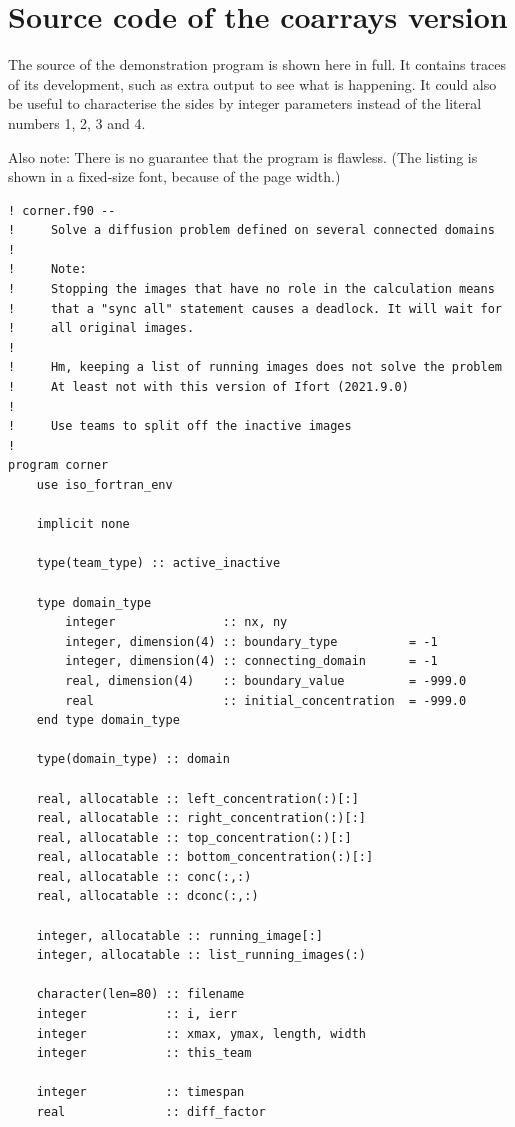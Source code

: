 \documentclass[onecolumn]{article}
\begin{document}
\appendix
\section{Source code of the coarrays version}
The source of the demonstration program is shown here in full. It contains traces of its development, such as extra output to see what is happening.
It could also be useful to characterise the sides by integer parameters instead of the literal numbers 1, 2, 3 and 4.

Also note: There is no guarantee that the program is flawless. (The listing is shown in a fixed-size font, because of the page width.)

\begin{small}
\begin{verbatim}
! corner.f90 --
!     Solve a diffusion problem defined on several connected domains
!
!     Note:
!     Stopping the images that have no role in the calculation means
!     that a "sync all" statement causes a deadlock. It will wait for
!     all original images.
!
!     Hm, keeping a list of running images does not solve the problem
!     At least not with this version of Ifort (2021.9.0)
!
!     Use teams to split off the inactive images
!
program corner
    use iso_fortran_env

    implicit none

    type(team_type) :: active_inactive

    type domain_type
        integer               :: nx, ny
        integer, dimension(4) :: boundary_type          = -1
        integer, dimension(4) :: connecting_domain      = -1
        real, dimension(4)    :: boundary_value         = -999.0
        real                  :: initial_concentration  = -999.0
    end type domain_type

    type(domain_type) :: domain

    real, allocatable :: left_concentration(:)[:]
    real, allocatable :: right_concentration(:)[:]
    real, allocatable :: top_concentration(:)[:]
    real, allocatable :: bottom_concentration(:)[:]
    real, allocatable :: conc(:,:)
    real, allocatable :: dconc(:,:)

    integer, allocatable :: running_image[:]
    integer, allocatable :: list_running_images(:)

    character(len=80) :: filename
    integer           :: i, ierr
    integer           :: xmax, ymax, length, width
    integer           :: this_team

    integer           :: timespan
    real              :: diff_factor


\end{verbatim}
\end{small}
\end{document}
